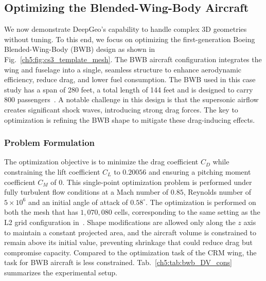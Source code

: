 \subsection{Optimizing the Blended-Wing-Body Aircraft}
\label{ch5:sec:cs3}

We now demonstrate DeepGeo's capability to handle complex 3D geometries without tuning. To this end, we focus on optimizing the first-generation Boeing Blended-Wing-Body (BWB) design as shown in Fig.~\ref{ch5:fig:cs3_template_mesh}. The BWB aircraft configuration integrates the wing and fuselage into a single, seamless structure to enhance aerodynamic efficiency, reduce drag, and lower fuel consumption. The BWB used in this case study has a span of 280 feet, a total length of 144 feet and is designed to carry 800 passengers~\cite{aa.Liebeck2004}.
A notable challenge in this design is that the supersonic airflow creates significant shock waves, introducing strong drag forces. The key to optimization is refining the BWB shape to mitigate these drag-inducing effects.

\subsubsection{Problem Formulation}



The optimization objective is to minimize the drag coefficient $C_D$ while constraining the lift coefficient $C_L$ to $0.20056$ and ensuring a pitching moment coefficient $C_M$ of 0. This single-point optimization problem is performed under fully turbulent flow conditions at a Mach number of $0.85$, Reynolds number of $5\times10^6$ and an initial angle of attack of $0.58^{\circ}$. The optimization is performed on both the mesh that has $1,070,080$ cells, corresponding to the same setting as the L2 grid configuration in~\citet{aa.Lyu2014}. Shape modifications are allowed only along the $z$ axis to maintain a constant projected area, and the aircraft volume is constrained to remain above its initial value, preventing shrinkage that could reduce drag but compromise capacity. Compared to the optimization task of the CRM wing, the task for BWB aircraft is less constrained. Tab.~\ref{ch5:tab:bwb_DV_cons} summarizes the experimental setup. 

